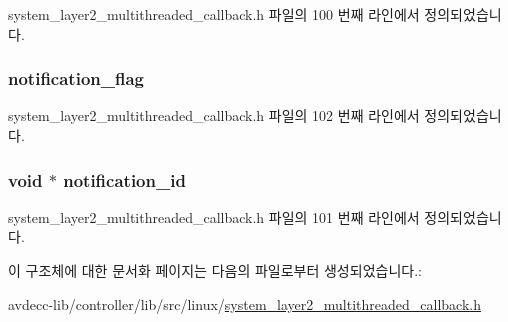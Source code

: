 system\+\_\+layer2\+\_\+multithreaded\+\_\+callback.\+h 파일의 100 번째 라인에서 정의되었습니다.

\subsubsection[{\texorpdfstring{notification\+\_\+flag}{notification_flag}}]{ notification\+\_\+flag}\hypertarget{structavdecc__lib_1_1system__layer2__multithreaded__callback_1_1tx__data_a01e6e66d891af833ee1998e9309623cd}{}\label{structavdecc__lib_1_1system__layer2__multithreaded__callback_1_1tx__data_a01e6e66d891af833ee1998e9309623cd}


system\+\_\+layer2\+\_\+multithreaded\+\_\+callback.\+h 파일의 102 번째 라인에서 정의되었습니다.

\subsubsection[{\texorpdfstring{notification\+\_\+id}{notification_id}}]{\setlength{\rightskip}{0pt plus 5cm}void $\ast$ notification\+\_\+id}\hypertarget{structavdecc__lib_1_1system__layer2__multithreaded__callback_1_1tx__data_a3b9916d5ab0c98a3d83a5cb17fff999d}{}\label{structavdecc__lib_1_1system__layer2__multithreaded__callback_1_1tx__data_a3b9916d5ab0c98a3d83a5cb17fff999d}


system\+\_\+layer2\+\_\+multithreaded\+\_\+callback.\+h 파일의 101 번째 라인에서 정의되었습니다.



이 구조체에 대한 문서화 페이지는 다음의 파일로부터 생성되었습니다.\+:\begin{DoxyCompactItemize}
\item 
avdecc-\/lib/controller/lib/src/linux/\hyperlink{linux_2system__layer2__multithreaded__callback_8h}{system\+\_\+layer2\+\_\+multithreaded\+\_\+callback.\+h}\end{DoxyCompactItemize}

